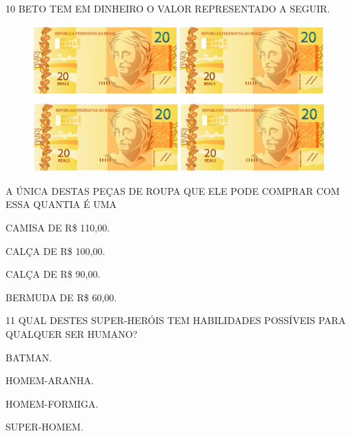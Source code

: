 \num{10} BETO TEM EM DINHEIRO O VALOR REPRESENTADO A SEGUIR.

\begin{figure}[H]
\centering
\includegraphics[width=\textwidth]{./media/SAEB_1ANO_MAT_FIGURA133b.png}
\end{figure}

A ÚNICA DESTAS PEÇAS DE ROUPA QUE ELE PODE COMPRAR COM ESSA QUANTIA É UMA

\begin{escolha}
\item CAMISA DE R\$ 110,00.

\item CALÇA DE R\$ 100,00.

\item CALÇA DE R\$ 90,00.

\item BERMUDA DE R\$ 60,00.
\end{escolha}

\num{11} QUAL DESTES SUPER-HERÓIS TEM HABILIDADES POSSÍVEIS PARA QUALQUER SER HUMANO?

\begin{escolha}
\item BATMAN.

\item HOMEM-ARANHA.

\item HOMEM-FORMIGA.

\item SUPER-HOMEM.
\end{escolha}

